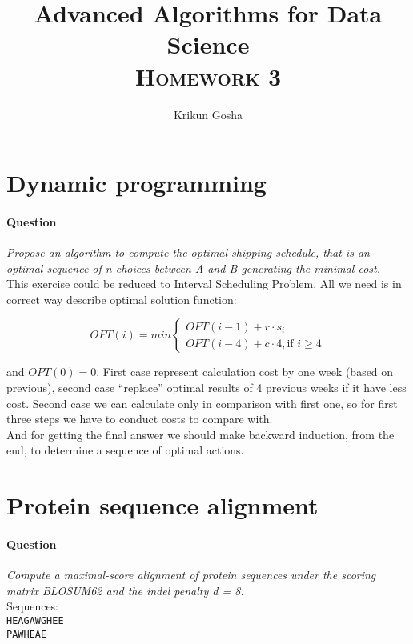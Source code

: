 \documentclass{article}
\title{Advanced Algorithms for Data Science \\ \textsc{Homework 3}}
\author{Krikun Gosha}
\date{ }
\begin{document}
\maketitle
\section{Dynamic programming}
\paragraph{Question}
\textit{Propose an algorithm to compute the optimal shipping schedule, that is
  an optimal sequence of n choices between A and B generating the minimal
  cost.}\\ 

This exercise could be reduced to Interval Scheduling Problem. All we need is in
correct way describe optimal solution function:

$$
OPT(i) = \textit{min}
\begin{cases}
  OPT(i-1) + r \cdot s_i \\
  OPT(i-4) + c \cdot 4, \text{if } i \geq 4
\end{cases}
$$

and $OPT(0) = 0$. First case represent calculation cost by one week (based on
previous), second case ``replace'' optimal results of 4 previous weeks if it
have less cost. Second case we can calculate only in comparison with first one,
so for first three steps we have to conduct costs to compare with.\\
  
And for getting the final answer we should make backward induction, from the
end, to determine a sequence of optimal actions.  

\section{Protein sequence alignment}
\paragraph{Question}
\textit{Compute a maximal-score alignment of protein sequences under the scoring
  matrix BLOSUM62 and the indel penalty d = 8.}\\

Sequences:\\

\texttt{HEAGAWGHEE}\\
\texttt{PAWHEAE}\\
\end{document}
